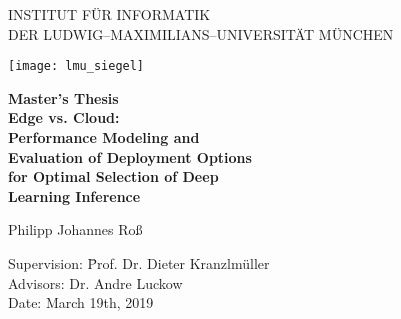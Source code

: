 \begin{center}

\vspace*{-2cm}

{\Huge INSTITUT FÜR INFORMATIK\\[1mm]}
DER LUDWIG--MAXIMILIANS--UNIVERSITÄT MÜNCHEN\\

\vspace*{1cm}

\texttt{[image: lmu\_siegel]}

\vspace*{2cm}

{\Large \textbf{Master's Thesis}}\\ %

\vspace{2.0cm}
{\Huge \textbf{Edge vs. Cloud:}}\\
\vspace*{2.0mm}
{\Huge \textbf{Performance Modeling and}}\\
\vspace*{2.0mm}
{\Huge \textbf{Evaluation of Deployment Options}}\\
 \vspace*{2.0mm}
{\Huge \textbf{for Optimal Selection of Deep}}\\
 \vspace*{2.0mm}
{\Huge \textbf{Learning Inference}}\\
\vspace{1.0cm}

{\LARGE Philipp Johannes Roß} %
\vspace{2cm}

\parbox{1cm}{
\begin{large}
\begin{tabbing}
Supervision: \hspace{.5cm} \=Prof. Dr. Dieter Kranzlmüller\\[2mm]
Advisors:
\>Dr. Andre Luckow\\[2mm]
Date: \> March 19th, 2019\\
\end{tabbing}
\end{large}}\\
\vspace{5mm}

\end{center}

